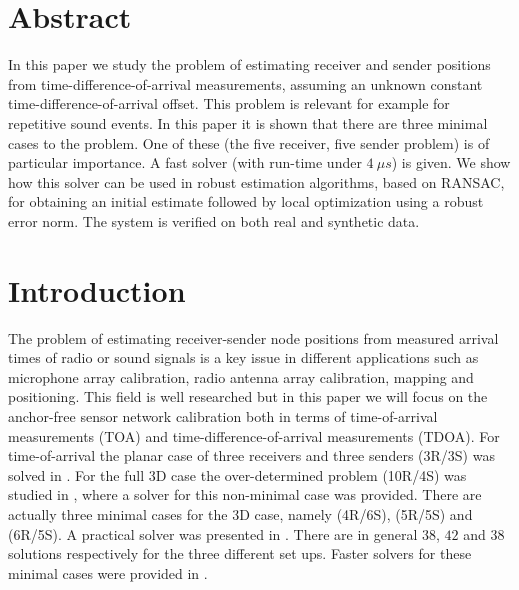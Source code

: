 \documentclass[
]{book}
\begin{document}
\newpage

\hypertarget{sfsabstract}{%
\section*{Abstract}\label{sfsabstract}}

In this paper we study the problem of estimating receiver and sender positions from time-difference-of-arrival measurements, assuming an unknown constant time-difference-of-arrival offset. This problem is relevant for example for repetitive sound events. In this paper it is shown that there are three minimal cases to the problem. One of these (the five receiver, five sender problem) is of particular importance. A fast solver (with run-time under \(4~ \mu s\)) is given. We show how this solver can be used in robust estimation algorithms, based on RANSAC, for obtaining an initial estimate followed by local optimization using a robust error norm. The system is verified on both real and synthetic data.

\newpage

\hypertarget{introduction-3}{%
\section{Introduction}\label{introduction-3}}

The problem of estimating receiver-sender node positions from measured arrival times of radio or sound signals is a key issue in different applications such as microphone array calibration, radio antenna array calibration, mapping and positioning. This field is well researched but in this paper we will focus on the anchor-free sensor network calibration both in terms of time-of-arrival measurements (TOA) and time-difference-of-arrival measurements (TDOA).
For time-of-arrival the planar case of three receivers and three senders (3R/3S) was solved in \cite{stewenius-phd-2005}.
For the full 3D case the over-determined problem (10R/4S) was studied in \cite{pollefeys-nister-icassp-08}, where a solver for this non-minimal case was provided. There are actually three minimal cases for the 3D case, namely (4R/6S), (5R/5S) and (6R/5S). A practical solver was presented in
\cite{kuang-burgess-etal-icassp-13}. There are in general \(38\), \(42\) and \(38\) solutions respectively for the three different set ups.
Faster solvers for these minimal cases were provided in \cite{larsson2017polynomial}.
\end{document}
